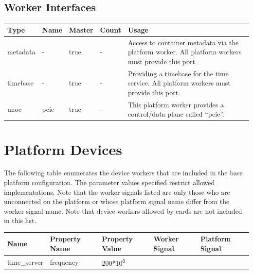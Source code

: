 \documentclass{article}
\begin{document}
\begin{landscape}
	\section*{Worker Interfaces}
	\begin{scriptsize}
		\begin{tabular}{|M{2cm}|M{2cm}|M{1.5cm}|M{1.5cm}|M{14.5cm}|}
			\hline
			Type       & Name & Master & Count & Usage                  \\
			\hline
			metadata   & -    & true   & -     & Access to container metadata via the platform worker. All platform workers must provide this port. \\
			\hline
			timebase   & -    & true   & -     & Providing a timebase for the time service. All platform workers must provide this port. \\
			\hline
			unoc       & pcie & true   & -     & This platform worker provides a control/data plane called ``pcie''. \\
			\hline
		\end{tabular}
	\end{scriptsize}

\end{landscape}
\pagebreak

\section*{Platform Devices}
The following table enumerates the device workers that are included in the base platform configuration. The parameter values specified restrict allowed implementations. Note that the worker signals listed are only those who are unconnected on the platform or whose platform signal name differ from the worker signal name. Note that device workers allowed by cards are not included in this list. \\ \newline
\begin{tabular}{|M{3cm}|M{3.5cm}|M{3cm}|M{3cm}|M{3cm}|}
	\hline
	Name                       & Property Name    & Property Value              & Worker Signal & Platform Signal         \\
	\hline
	time\_server               & frequency        & 200*10\textsuperscript{6}   &               &                         \\
	\hline
\end{tabular}
\end{document}
